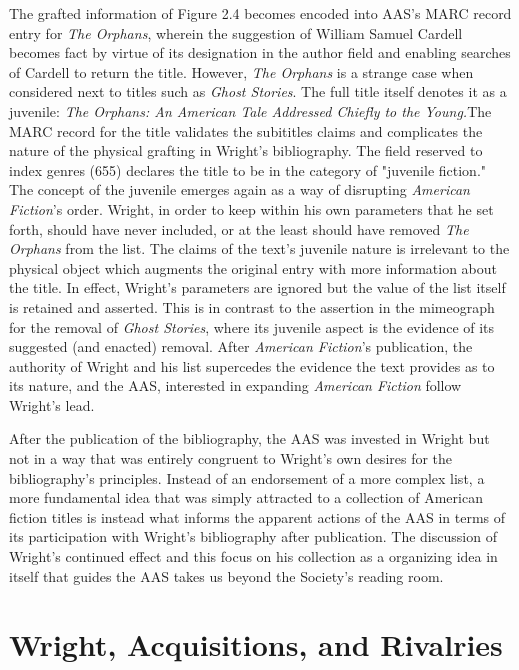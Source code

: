 The grafted information of Figure 2.4 becomes encoded into AAS's MARC record entry for \textit{The Orphans}, wherein the suggestion of William Samuel Cardell becomes fact by virtue of its designation in the author field and enabling searches of Cardell to return the title. However, \textit{The Orphans} is a strange case when considered next to titles such as \textit{Ghost Stories}. The full title itself denotes it as a juvenile: \textit{The Orphans: An American Tale Addressed Chiefly to the Young.}The MARC record for the title validates the subititles claims and complicates the nature of the physical grafting in Wright's bibliography. The field reserved to index genres (655) declares the title to be in the category of "juvenile fiction."\autocite{cardell_orphans:_1825} The concept of the juvenile emerges again as a way of disrupting \textit{American Fiction}'s order. Wright, in order to keep within his own parameters that he set forth,  should have never included, or at the least should have removed \textit{The Orphans} from the list. The claims of the text's juvenile nature is irrelevant to the physical object which augments the original entry with more information about the title. In effect, Wright's parameters are ignored but the value of the list itself is retained and asserted. This is in contrast to the assertion in the mimeograph for the removal of \textit{Ghost Stories}, where its juvenile aspect is the evidence of its suggested (and enacted) removal. After \textit{American Fiction}'s publication, the authority of Wright and his list supercedes the evidence the text provides as to its nature, and the AAS, interested in expanding \textit{American Fiction} follow Wright's lead.

After the publication of the bibliography, the AAS was invested in Wright but not in a way that was entirely congruent to Wright's own desires for the bibliography's principles. Instead of an endorsement of a more complex list, a more fundamental idea that was simply attracted to a collection of American fiction titles is instead what informs the apparent actions of the AAS in terms of its participation with Wright's bibliography after publication. The discussion of Wright's continued effect and this focus on his collection as a organizing idea in itself that guides the AAS takes us beyond the Society's reading room. 

\section{Wright, Acquisitions, and Rivalries}

